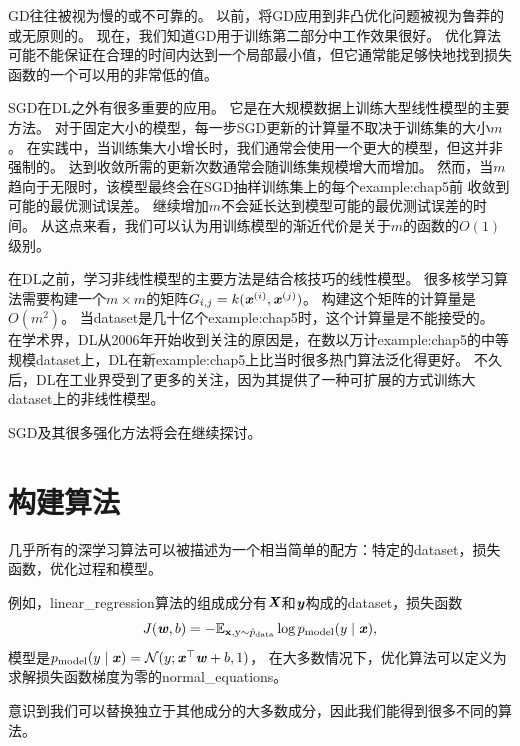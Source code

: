 \gls{GD}往往被视为慢的或不可靠的。
以前，将\gls{GD}应用到非凸优化问题被视为鲁莽的或无原则的。
现在，我们知道\gls{GD}用于训练第二部分中工作效果很好。
优化算法可能不能保证在合理的时间内达到一个局部最小值，但它通常能足够快地找到损失函数的一个可以用的非常低的值。 


\gls{SGD}在\gls{DL}之外有很多重要的应用。
它是在大规模数据上训练大型线性模型的主要方法。
对于固定大小的模型，每一步\gls{SGD}更新的计算量不取决于训练集的大小$m$。
在实践中，当训练集大小增长时，我们通常会使用一个更大的模型，但这并非强制的。
达到收敛所需的更新次数通常会随训练集规模增大而增加。
然而，当$m$趋向于无限时，该模型最终会在\gls{SGD}抽样训练集上的每个\gls{example:chap5}前
收敛到可能的最优测试误差。
继续增加$m$不会延长达到模型可能的最优测试误差的时间。
从这点来看，我们可以认为用训练模型的渐近代价是关于$m$的函数的$O(1)$级别。

在\gls{DL}之前，学习非线性模型的主要方法是结合核技巧的线性模型。
很多核学习算法需要构建一个$m\times m$的矩阵$G_{i,j}=k(\boldsymbol{\mathit{x}}^{(i)}, \boldsymbol{\mathit{x}}^{(j)})$。
构建这个矩阵的计算量是$O(m^2)$。
当\gls{dataset}是几十亿个\gls{example:chap5}时，这个计算量是不能接受的。
在学术界，\gls{DL}从2006年开始收到关注的原因是，在数以万计\gls{example:chap5}的中等规模\gls{dataset}上，\gls{DL}在新\gls{example:chap5}上比当时很多热门算法泛化得更好。
不久后，\gls{DL}在工业界受到了更多的关注，因为其提供了一种可扩展的方式训练大\gls{dataset}上的非线性模型。

\gls{SGD}及其很多强化方法将会在继续探讨。

\section{构建算法}
\label{sec:building_a_machine_learning_algorithm}
几乎所有的深学习算法可以被描述为一个相当简单的配方：特定的\gls{dataset}，损失函数，优化过程和模型。

例如，\gls{linear_regression}算法的组成成分有$\boldsymbol{\mathit{X}}$和$\boldsymbol{\mathit{y}}$构成的\gls{dataset}，损失函数
\begin{equation}
    J(\boldsymbol{\mathit{w}}, b) = -\mathbb{E}_{\mathbf{x},\mathrm{y}\sim\hat{p}_{\text{data}}}
    \log p_{\text{model}} (y \mid \boldsymbol{\mathit{x}}) ,
\end{equation}
模型是$p_{\text{model}} (y \mid \boldsymbol{\mathit{x}}) = \mathcal{N}(y; \boldsymbol{\mathit{x}}^\top \boldsymbol{\mathit{w}} + b, 1)$，
在大多数情况下，优化算法可以定义为求解损失函数梯度为零的\gls{normal_equations}。

意识到我们可以替换独立于其他成分的大多数成分，因此我们能得到很多不同的算法。

